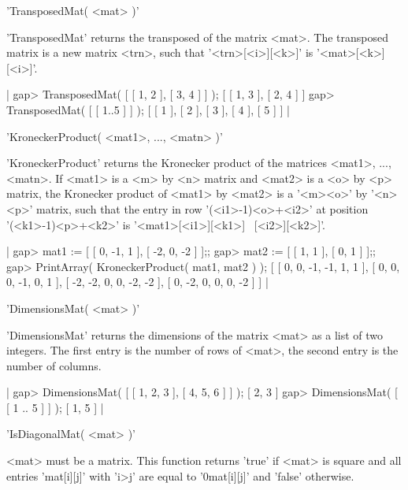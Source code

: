 
'TransposedMat( <mat> )'

'TransposedMat'  returns  the  transposed  of   the  matrix  <mat>.   The
transposed matrix is a new  matrix  <trn>, such that '<trn>[<i>][<k>]' is
'<mat>[<k>][<i>]'.

|    gap> TransposedMat( [ [ 1, 2 ], [ 3, 4 ] ] );
    [ [ 1, 3 ], [ 2, 4 ] ]
    gap> TransposedMat( [ [ 1..5 ] ] );
    [ [ 1 ], [ 2 ], [ 3 ], [ 4 ], [ 5 ] ] |


'KroneckerProduct( <mat1>, ..., <matn> )'

'KroneckerProduct'  returns the  Kronecker product  of the matrices <mat1>,
...,  <matn>. If <mat1> is a  <m> by <n> matrix and  <mat2> is a <o> by <p>
matrix,  the  Kronecker  product  of  <mat1>  by  <mat2> is a '<m>\*<o>' by
'<n>\*<p>'  matrix,  such  that  the  entry  in row '(<i1>-1)\*<o>+<i2>' at
position '(<k1>-1)\*<p>+<k2>' is '<mat1>[<i1>][<k1>] \*\
<mat2>[<i2>][<k2>]'.

|    gap> mat1 := [ [ 0, -1, 1 ], [ -2, 0, -2 ] ];;
    gap> mat2 := [ [ 1, 1 ], [ 0, 1 ] ];;
    gap> PrintArray( KroneckerProduct( mat1, mat2 ) );
    [ [   0,   0,  -1,  -1,   1,   1 ],
      [   0,   0,   0,  -1,   0,   1 ],
      [  -2,  -2,   0,   0,  -2,  -2 ],
      [   0,  -2,   0,   0,   0,  -2 ] ] |

\Section{DimensionsMat}

'DimensionsMat( <mat> )'

'DimensionsMat' returns the dimensions of the matrix <mat>  as  a list of
two integers.  The first entry is the number of rows of <mat>, the second
entry is the number of columns.

|    gap> DimensionsMat( [ [ 1, 2, 3 ], [ 4, 5, 6 ] ] );
    [ 2, 3 ]
    gap> DimensionsMat( [ [ 1 .. 5 ] ] );
    [ 1, 5 ] |

\Section{IsDiagonalMat}

'IsDiagonalMat( <mat> )'

<mat> must be a matrix. This function returns 'true' if <mat> is square and
all  entries  'mat[i][j]'  with  'i\<>j'  are  equal  to '0\*mat[i][j]' and
'false' otherwise.

